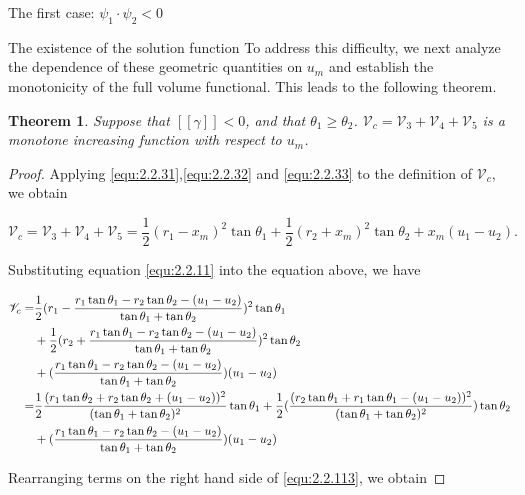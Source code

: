 \documentclass[letterpaper,reqno,10pt,twoside]{amsart}
\newtheorem{theorem}{Theorem}[section]
\theoremstyle{definition}
\theoremstyle{remark}
\begin{document}
\begin{section}{The first case: $\psi_1\cdot \psi_2<0$ }
\begin{subsection}{The existence of the solution function}
     To address this difficulty, we next analyze the dependence of these geometric quantities on $u_{m}$ and establish the monotonicity of the full volume functional. This leads to the following theorem.

     \begin{theorem}
        Suppose that $[\![\gamma]\!]<0$, and that $\theta_1\geq \theta_2$. $ \mathscr{V}_{c}=\mathscr{V}_{3}+\mathscr{V}_{4}+\mathscr{V}_{5}$ is a monotone increasing function with respect to $u_{m}$.
    \end{theorem}

    \begin{proof}

    Applying \eqref{equ:2.2.31},\eqref{equ:2.2.32} and \eqref{equ:2.2.33} to the definition of $\mathscr{V}_{c}$, we obtain

    \begin{equation*}
        \mathscr{V}_{c}=\mathscr{V}_{3}+\mathscr{V}_{4}+\mathscr{V}_{5}=\frac{1}{2}(r_1-x_{m})^{2}\tan\theta_{1}+\frac{1}{2}(r_{2}+x_{m})^{2}\tan\theta_{2}+x_{m}(u_1-u_2).
    \end{equation*}

    Substituting equation \eqref{equ:2.2.11} into the equation above, we have

    \begin{align}
        \mathscr{V}_{c}=&\frac{1}{2}(r_{1}-\frac{r_1\tan\theta_1-r_2\tan\theta_2-(u_1-u_2)}{\tan\theta_1+\tan\theta_{2}})^{2}\tan\theta_1 \notag\\
        &+\frac{1}{2}(r_{2}+\frac{r_1\tan\theta_1-r_2\tan\theta_2-(u_1-u_2)}{\tan\theta_1+\tan\theta_{2}})^{2}\tan\theta_2 \notag \\
         &+(\frac{r_1\tan\theta_1-r_2\tan\theta_2-(u_1-u_2)}{\tan\theta_1+\tan\theta_{2}})(u_1-u_2)\notag\\
         =&\frac{1}{2}\frac{(r_1\tan\theta_2+r_2\tan\theta_2+(u_1-u_2))^{2}}{(\tan\theta_1+\tan\theta_2)^{2}}\tan\theta_1+\frac{1}{2}(\frac{(r_{2}\tan\theta_1+r_{1}\tan\theta_1-(u_1-u_2))^{2}}{(\tan\theta_1+\tan\theta_2)^{2}})\tan\theta_2 \notag\\
        & +(\frac{r_1\tan\theta_1-r_2\tan\theta_2-(u_1-u_2)}{\tan\theta_1+\tan\theta_{2}})(u_1-u_2) \label{equ:2.2.113}
    \end{align}

    \noindent Rearranging terms on the right hand side of \eqref{equ:2.2.113}, we obtain


\end{proof}
\end{subsection}
\end{section}
\end{document}
